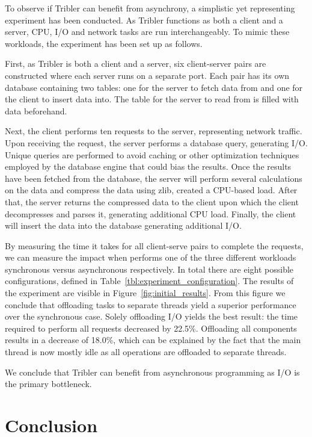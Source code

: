 To observe if Tribler can benefit from asynchrony, a simplistic yet representing experiment has been conducted.
As Tribler functions as both a client and a server, CPU, I/O and network tasks are run interchangeably.
To mimic these workloads, the experiment has been set up as follows. 

First, as Tribler is both a client and a server, six client-server pairs are constructed where each server runs on a separate port.
Each pair has its own database containing two tables: one for the server to fetch data from and one for the client to insert data into. 
The table for the server to read from is filled with data beforehand.

Next, the client performs ten requests to the server, representing network traffic.
Upon receiving the request, the server performs a database query, generating I/O.
Unique queries are performed to avoid caching or other optimization techniques employed by the database engine that could bias the results.
Once the results have been fetched from the database, the server will perform several calculations on the data and compress the data using zlib, created a CPU-based load.
After that, the server returns the compressed data to the client upon which the client decompresses and parses it, generating additional CPU load.
Finally, the client will insert the data into the database generating additional I/O.

By measuring the time it takes for all client-serve pairs to complete the requests, we can measure the impact when performs one of the three different workloads synchronous versus asynchronous respectively.
In total there are eight possible configurations, defined in Table~\ref{tbl:experiment_configuration}.
The results of the experiment are visible in Figure~\ref{fig:initial_results}.
From this figure we conclude that offloading tasks to separate threads yield a superior performance over the synchronous case. Solely offloading I/O yields the best result: the time required to perform all requests decreased by 22.5\%.
Offloading all components results in a decrease of 18.0\%, which can be explained by the fact that the main thread is now mostly idle as all operations are offloaded to separate threads.

We conclude that Tribler can benefit from asynchronous programming as I/O is the primary bottleneck.

\section{Conclusion}

